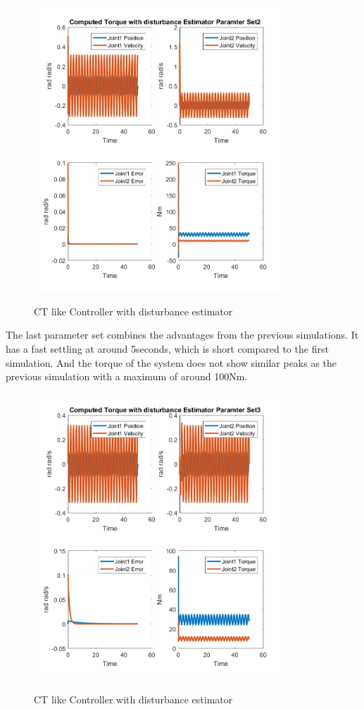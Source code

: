 \begin{figure}[]
	\centering
	\includegraphics[width=0.85\textwidth]{pics/ComputedTorquewithdisturbanceEstimatorParamterSet2.png}\\
	\caption{CT like Controller with disturbance estimator}
	\label{fig:ch4_esti2}
\end{figure}

The last parameter set combines the advantages from the previous simulations. It has a fast settling at around 5seconds, which is short compared to the first simulation. And the torque of the system does not show similar peaks as the previous simulation with a maximum of around 100Nm.
\begin{figure}[]
	\centering
	\includegraphics[width=0.85\textwidth]{pics/ComputedTorquewithdisturbanceEstimatorParamterSet3.png}\\
	\caption{CT like Controller with disturbance estimator}
	\label{fig:ch4_esti3}
\end{figure}

